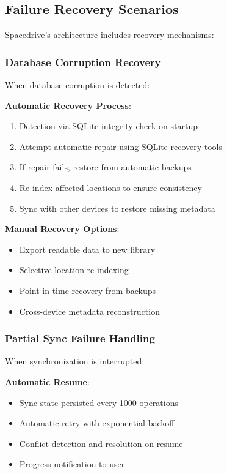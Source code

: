 \documentclass[sigconf]{acmart}
\begin{document}
\subsection{Failure Recovery Scenarios}
Spacedrive's architecture includes recovery mechanisms:

\subsubsection{Database Corruption Recovery}
When database corruption is detected:

\textbf{Automatic Recovery Process}:
\begin{enumerate}[noitemsep, topsep=0pt]
\item Detection via SQLite integrity check on startup
\item Attempt automatic repair using SQLite recovery tools
\item If repair fails, restore from automatic backups
\item Re-index affected locations to ensure consistency
\item Sync with other devices to restore missing metadata
\end{enumerate}

\textbf{Manual Recovery Options}:
\begin{itemize}[noitemsep, topsep=0pt]
\item Export readable data to new library
\item Selective location re-indexing
\item Point-in-time recovery from backups
\item Cross-device metadata reconstruction
\end{itemize}

\subsubsection{Partial Sync Failure Handling}
When synchronization is interrupted:

\textbf{Automatic Resume}:
\begin{itemize}[noitemsep, topsep=0pt]
\item Sync state persisted every 1000 operations
\item Automatic retry with exponential backoff
\item Conflict detection and resolution on resume
\item Progress notification to user
\end{itemize}
\end{document}
